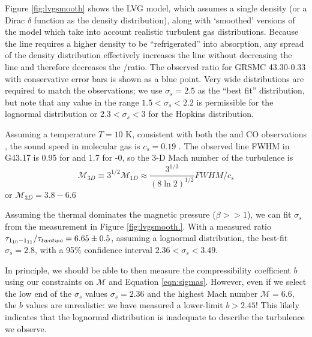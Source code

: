 Figure \ref{fig:lvgsmooth} shows the LVG model, which assumes a single density
(or a Dirac $\delta$ function as the density distribution), along with
`smoothed' versions of the model which take into account realistic turbulent
gas distributions.  Because the \formaldehyde \twotwo line requires a higher
density to be ``refrigerated'' into absorption, any spread of the density
distribution effectively increases the \twotwo line without decreasing the
\oneone line and therefore decreases the \oneone/\twotwo ratio.  The observed
ratio for GRSMC 43.30-0.33 with conservative error bars is shown as a blue
point.  Very wide distributions are required to match the observations; we use
$\sigma_s=2.5$ as the ``best fit'' distribution, but note that any value in the
range $1.5<\sigma_s<2.2$  is permissible for the
lognormal distribution or $2.3 < \sigma_s < 3$ for the Hopkins distribution.

Assuming a temperature $T=10$ K, consistent with both the \formaldehyde and CO
observations \citep{Plume2004a}, the sound speed in molecular gas is $c_s=0.19$
\kms.  The observed line FWHM in G43.17 is 0.95 \kms for \formaldehyde and 1.7 \kms for
-0,
so the 3-D Mach number of the turbulence is
$$\mathcal{M}_{3D} \equiv 3^{1/2} \mathcal{M}_{1D} \approx \frac{3^{1/3}}{(8\ln 2)^{1/2}} FWHM / c_s $$
or $\mathcal{M}_{3D} = 3.8 - 6.6 $



Assuming the thermal dominates the magnetic pressure ($\beta>>1$), we can fit
$\sigma_s$ from the measurement in Figure \ref{fig:lvgsmooth.}.  With a
measured ratio $\tau_{1_{10}-1_{11}}/\tau_{twotwo} = 6.65 \pm 0.5$, assuming a lognormal
distribution, the best-fit
$\sigma_s=2.8$, with a 95\% confidence interval $2.36 < \sigma_s < 3.49$.

In principle, we should be able to then measure the compressibility coefficient
$b$ using our constraints on $\mathcal{M}$ and Equation \ref{eqn:sigmas}.
However, even if we select the low end of the $\sigma_s$ values $\sigma_s=2.36$
and the highest Mach number $\mathcal{M} = 6.6$, the $b$ values are
unrealistic: we have measured a lower-limit $b>2.45$!  This likely indicates
that the lognormal distribution is inadequate to describe the turbulence we
observe.

